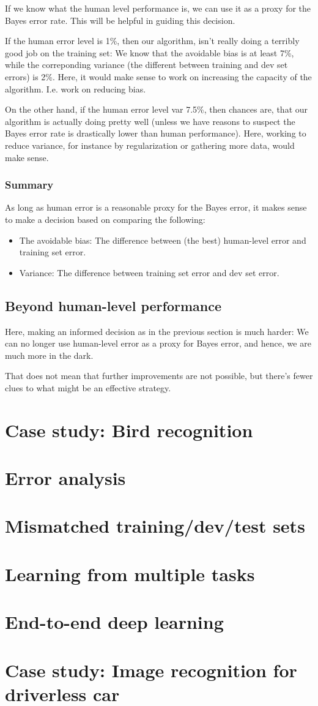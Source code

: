 \documentclass[12pt, a4paper]{article}
\numberwithin{equation}{section}
\begin{document}
If we know what the human level performance is, we can use it as a proxy for the Bayes error rate. This will be helpful in guiding this decision.

If the human error level is 1\%, then our algorithm, isn't really doing a terribly good job on the training set: We know that the avoidable bias is at least 7\%, while the correponding variance (the different between training and dev set errors) is 2\%. Here, it would make sense to work on increasing the capacity of the algorithm. I.e. work on reducing bias.

On the other hand, if the human error level var 7.5\%, then chances are, that our algorithm is actually doing pretty well (unless we have reasons to suspect the Bayes error rate is drastically lower than human performance). Here, working to reduce variance, for instance by regularization or gathering more data, would make sense.

\subsubsection{Summary}
As long as human error is a reasonable proxy for the Bayes error, it makes sense to make a decision based on comparing the following:
\begin{itemize}
\item The avoidable bias: The difference between (the best) human-level error and training set error.
\item Variance: The difference between training set error and dev set error.
\end{itemize}

\subsection{Beyond human-level performance}
Here, making an informed decision as in the previous section is much harder: We can no longer use human-level error as a proxy for Bayes error, and hence, we are much more in the dark.

That does not mean that further improvements are not possible, but there's fewer clues to what might be an effective strategy.

\section{Case study: Bird recognition}


\section{Error analysis}


\section{Mismatched training/dev/test sets}


\section{Learning from multiple tasks}


\section{End-to-end deep learning}


\section{Case study: Image recognition for driverless car}
\end{document}
